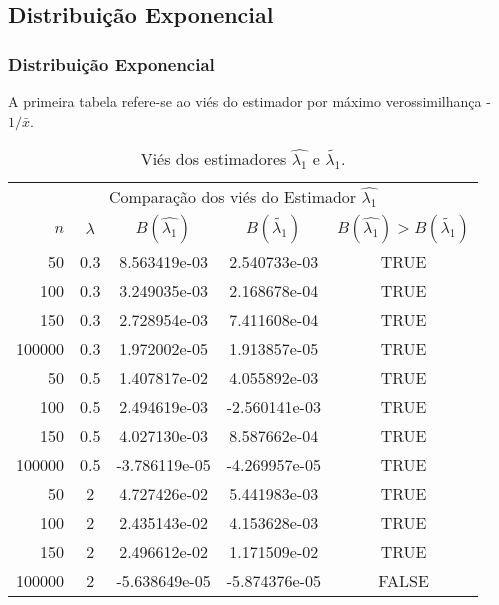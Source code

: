 \subsection{Distribuição Exponencial}
\begin{frame}
\frametitle{Distribuição Exponencial} 
A primeira tabela refere-se ao viés do estimador por máximo verossimilhança - $1/\bar{x}$.

\begin{table}[H]
\caption{Viés dos estimadores $\hat{\lambda_{1}}$ e $\tilde{\lambda_{1}}$.}
\label{tab:p1Vies}
\tiny
\centering
\begin{tabular}{rcccc}
\toprule
\multicolumn{5}{c}{Comparação dos viés do Estimador $\hat{\lambda_{1}}$}\\
$n$ & $\lambda$ & $B(\hat{\lambda_{1}})$ & $B(\tilde{\lambda_{1}})$ & $B(\hat{\lambda_{1}})>B(\tilde{\lambda_{1}})$ \\
\midrule
50 & 0.3 & 8.563419e-03 & 2.540733e-03  & TRUE \\
100 & 0.3 & 3.249035e-03 & 2.168678e-04 & TRUE \\
150 & 0.3 & 2.728954e-03 & 7.411608e-04 & TRUE \\
100000 & 0.3 & 1.972002e-05 & 1.913857e-05 & TRUE \\
\midrule
50 & 0.5 & 1.407817e-02 & 4.055892e-03  & TRUE \\
100 & 0.5 &  2.494619e-03 & -2.560141e-03 & TRUE \\
150 & 0.5 &  4.027130e-03  & 8.587662e-04 & TRUE\\
100000 & 0.5 & -3.786119e-05 & -4.269957e-05 & TRUE \\
\midrule
50 & 2 & 4.727426e-02 &  5.441983e-03 & TRUE \\
100 & 2 & 2.435143e-02 & 4.153628e-03 & TRUE \\
150 & 2 & 2.496612e-02 & 1.171509e-02 & TRUE \\
100000 & 2 & -5.638649e-05 & -5.874376e-05 & FALSE \\
\bottomrule
\end{tabular}
\end{table}
\end{frame}

